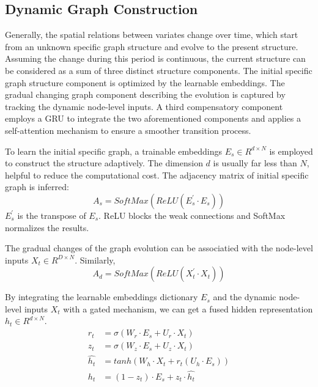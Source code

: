 \documentclass[final,12pt]{elsarticle}
\begin{document}
\subsection{Dynamic Graph Construction}
\label{subsec-4.3}


Generally, the spatial relations between variates change over time, 
which start from an unknown specific graph structure 
and evolve to the present structure.  %
Assuming the change during this period is continuous, 
the current structure can be considered 
as a sum of three distinct structure components.  %
The initial specific graph structure component 
is optimized by the learnable embeddings.
The gradual changing graph component describing the evolution 
is captured by tracking the dynamic node-level inputs.  %
A third compensatory component employs a GRU 
to integrate the two aforementioned components 
and applies a self-attention mechanism 
to ensure a smoother transition process.  %


To learn the initial specific graph, 
a trainable embeddings $E_{s} \in R^{d \times N}$ 
is employed to construct the structure adaptively.
The dimension $d$ is usually far less than $N$, 
helpful to reduce the computational cost.  %
The adjacency matrix of initial specific graph is inferred: 
\begin{equation}
  A_{s} = SoftMax(ReLU(E_{s}^{'} \cdot E_{s}))
\end{equation}
$E_{s}^{'}$ is the transpose of $E_{s}$.
ReLU blocks the weak connections 
and SoftMax normalizes the results.  %


The gradual changes of the graph evolution 
can be associatied with the node-level inputs 
$X_{t} \in R^{D \times N}$. Similarly, 
\begin{equation}
  A_{d} = SoftMax(ReLU(X_{t}^{'} \cdot X_{t}))
\end{equation}  %


By integrating the learnable embeddings dictionary $E_{s}$ 
and the dynamic node-level inputs $X_{t}$ 
with a gated mechanism, 
we can get a fused hidden representation 
$h_{t} \in R^{d \times N}$.  %
\begin{equation}
  \begin{aligned}
    r_{t}           &= \sigma(W_{r} \cdot E_{s} + U_{r} \cdot X_{t})  \\
    z_{t}           &= \sigma(W_{z} \cdot E_{s} + U_{z} \cdot X_{t})  \\
    \widehat{h_{t}} &= tanh(W_{h}   \cdot X_{t} + r_{t} (U_{h} \cdot E_{s}))  \\
    h_{t}           &= (1 - z_{t})  \cdot E_{s} + z_{t} \cdot \widehat{h_{t}}  \\
  \end{aligned}
\end{equation}
\end{document}
